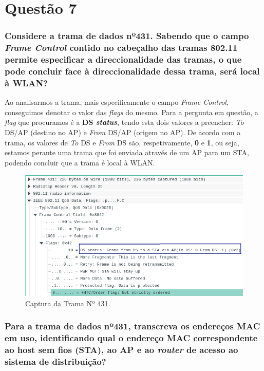 

\section{Questão 7}


\subsubsection{Considere a trama de dados nº431. Sabendo que o campo \textit{Frame Control} contido no cabeçalho das tramas 802.11 permite especificar a direccionalidade das tramas, o que pode concluir face à direccionalidade dessa trama, será local à WLAN?}

    \par Ao analisarmos a trama, mais especificamente o campo \textit{Frame Control}, conseguimos denotar o valor das \textit{flags} do mesmo. Para a pergunta em questão, a \textit{flag} que procuramos é a \textbf{DS \textit{status}}, tendo esta dois valores a preencher: \textit{To} DS/AP (destino no AP) e \textit{From} DS/AP (origem no AP). De acordo com a trama, os valores de \textit{To} DS e \textit{From} DS são, respetivamente, \textbf{0} e \textbf{1}, ou seja, estamos perante uma trama que foi enviada através de um AP para um STA, podendo concluir que a trama é local à WLAN.

    \begin{figure}[H]
    \centering
    \includegraphics[width=400pt]{Prints/Questao7/questao7-A.png}
    \caption{Captura da Trama Nº 431.} \label{questao7-1-trama431}
    \end{figure}





\vspace{20pt}
\subsubsection{Para a trama de dados nº431, transcreva os endereços MAC em uso, identificando qual o endereço MAC correspondente ao host sem fios (STA), ao AP e ao \textit{router} de acesso ao sistema de distribuição?}

